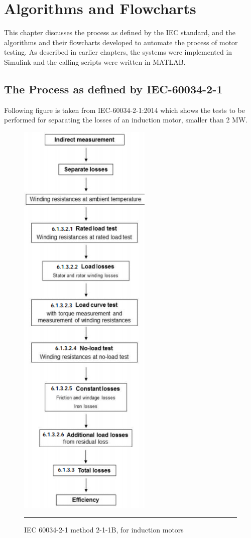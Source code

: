 \chapter{Algorithms and Flowcharts} %
\label{Chapter4}

This chapter discusses the process as defined by the IEC standard, and the algorithms and their flowcharts developed to automate the process of motor testing. As described in earlier chapters, the systems were implemented in Simulink and the calling scripts were written in MATLAB.

\section{The Process as defined by IEC-60034-2-1}
Following figure is taken from IEC-60034-2-1:2014 which shows the tests to be performed for separating the losses of an induction motor, smaller than 2 MW.
\begin{figure}[htbp]
	\centering
		\includegraphics[width = 2.5in]{./Figures/MS/fig41.png}
		\rule{35em}{0.5pt}
	\caption{IEC 60034-2-1 method 2-1-1B, for induction motors}
	\label{fig:IEC 60034-2-1 method 2-1-1B, for induction motors} 
\end{figure}
\newpage

